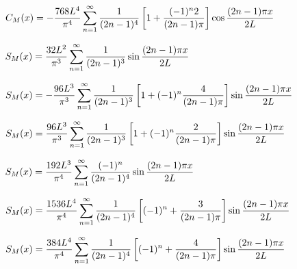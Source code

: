 $C_{M}(x)=-\displaystyle\frac{768L^{4}}{\pi^{4}}\sum_{n=1}^{\infty}\frac{1}{(2n-1)^{4}}\left[
1+\frac{(-1)^{n}2}{(2n-1)\pi}\right]\cos\frac{(2n-1)\pi
x}{2L}$

$S_{M}(x)=\displaystyle
\frac{32L^{2}}{\pi^{3}}\sum_{n=1}^{\infty}\frac{1}{(2n-1)^{3}}\sin\frac{(2n-1)\pi x}{2L}$

$S_{M}(x)
=\displaystyle-\frac{96L^{3}}{\pi^{3}}\sum_{n=1}^{\infty}
\frac{1}{(2n-1)^{3}}\left[1+(-1)^{n}\frac{4}{(2n-1)\pi}\right]\sin\frac{(2n-1)\pi x}{2L}$

$S_{M}(x)
=\displaystyle\frac{96L^{3}}{\pi^{3}}\sum_{n=1}^{\infty}
\frac{1}{(2n-1)^{3}}\left[1+(-1)^{n}\frac{2}{(2n-1)\pi}\right]\sin\frac{(2n-1)\pi
x}{2L}$

$S_{M}(x)=\displaystyle\frac{192L^{3}}{\pi^{4}}\sum_{n=1}^{\infty}\frac{(-1)^{n}}{(2n-1)^{4}}
\sin\frac{(2n-1)\pi x}{2L}$

$S_{M}(x)=\displaystyle\frac{1536L^{4}}{\pi^{4}}\sum_{n=1}^{\infty}\frac{1}{(2n-1)^{4}}
\left[(-1)^{n}+\frac{3}{(2n-1)\pi}\right]\sin\frac{(2n-1)\pi x}{2L}$

$S_{M}(x)=\displaystyle\frac{384L^{4}}{\pi^{4}}\sum_{n=1}^{\infty}\frac{1}{(2n-1)^{4}}
\left[(-1)^{n}+\frac{4}{(2n-1)\pi}\right]\sin\frac{(2n-1)\pi x}{2L}$

